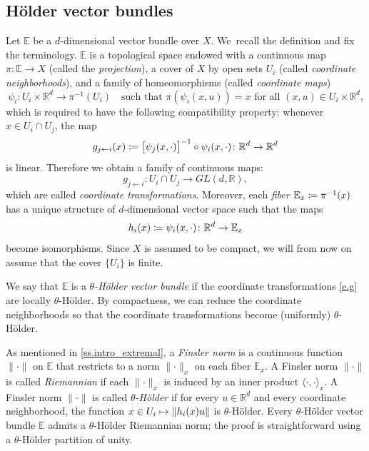 \documentclass[10pt]{amsart}
\def\vcentcolon{\mathrel{\mathop\ordinarycolon}}
\providecommand\ordinarycolon{:}
\providecommand*\coloneqq{\vcentcolon\mathrel{\mkern-1.2mu}=}
\newcommand\mto{\mathchoice{\longmapsto}{\mapsto}{\mapsto}{\mapsto}}
\theoremstyle{plain}
\theoremstyle{definition}
\newcommand{\RR}{\mathbb{R}}
\newcommand{\EE}{\mathbb{E}}
\newcommand{\GL}{\mathit{GL}}
\begin{document}
\subsection{Hölder vector bundles}

Let $\EE$ be a $d$-dimensional vector bundle over $X$.
We~recall the definition and fix the terminology. $\EE$ is a topological space endowed with a continuous map ${\pi \colon \EE \to X}$ (called the \emph{projection}),
a cover of $X$ by open sets $U_i$ (called \emph{coordinate neighborhoods}),
and a family of homeomorphisms (called \emph{coordinate maps})
\[
\psi_i \colon U_i \times \RR^d \to \pi^{-1}(U_i) \quad
\text{such that $\pi( \psi_i(x, u) ) = x$ for all $(x,u) \in U_i \times \RR^d$,}
\]
which is required to have the following compatibility property:
whenever $x \in U_i \cap U_j$, the map
\[
g_{j \gets i}(x) \coloneqq \big[ \psi_j(x, \mathord{\cdot})\big]^{-1} \circ \psi_i(x, \mathord{\cdot}) \colon \RR^d \to \RR^d
\]
is linear.
Therefore we obtain a family of continuous maps:
\begin{equation}\label{e.g}
g_{j \gets i} \colon U_i \cap U_j \to \GL(d,\RR),
\end{equation}
which are called \emph{coordinate transformations}.
Moreover, each \emph{fiber} $\EE_x \coloneqq \pi^{-1}(x)$ has a unique structure of $d$-dimensional vector space
such that the maps
\begin{equation}\label{e.h_i}
h_i(x) \coloneqq \psi_i(x, \mathord{\cdot}) \colon \RR^d \to \EE_x
\end{equation}
become isomorphisms.
Since $X$ is assumed to be compact, we will from now on assume that the cover $\{U_i\}$ is finite.

We say that $\EE$ is a \emph{$\theta$-Hölder vector bundle} if the coordinate transformations \eqref{e.g} are locally $\theta$-Hölder. By compactness, we can reduce the coordinate neighborhoods so that the coordinate transformations become (uniformly) $\theta$-Hölder.

As mentioned in \cref{ss.intro_extremal}, a \emph{Finsler norm}
is a continuous function $\| \mathord{\cdot} \|$ on $\EE$ that restricts to a norm $\| \mathord{\cdot} \|_x$ on each fiber $\EE_x$.
A Finsler norm $\| \mathord{\cdot} \|$ is called \emph{Riemannian} if each $\| \mathord{\cdot} \|_x$ is induced by an inner product $\langle \mathord{\cdot}, \mathord{\cdot} \rangle_x$.
A Finsler norm $\| \mathord{\cdot} \|$ is called \emph{$\theta$-Hölder} if for every $u \in \RR^d$ and every coordinate neighborhood, the function $x \in U_i \mto \| h_i(x) u \| $ is $\theta$-Hölder.
Every $\theta$-Hölder vector bundle $\EE$ admits a $\theta$-Hölder Riemannian norm; the proof is straightforward using a $\theta$-Hölder partition of unity.
\end{document}
